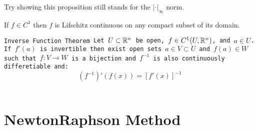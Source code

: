 \documentclass[11pt,a4paper]{article}
\begin{document}
Try showing this proposition still stands for the $|\cdot|_\infty$ norm.
\begin{corollary}
  If $f \in C^1$ then $f$ is Lifschitz continuous on any compact
  subset of its domain.
\end{corollary}
\begin{theorem}
\tt{Inverse Function Theorem}
Let $U \subset \mathbb{R}^n$ be open,
$f \in C^1(U,\mathbb{R}^n)$, and $a \in U$. If $f'(a)$ is invertible then
exist open sets $a \in V \subset U$ and $f(a) \in W$ such that
$f \colon V \to W$ is a bijection and $f^{-1}$ is also continuously 
differetiable and:
\[
  (f^{-1})'(f(x)) = [f'(x)]^{-1}
\]
\end{theorem}


\newpage

\section{Newton\textendash{}Raphson Method}

\newpage
\end{document}

